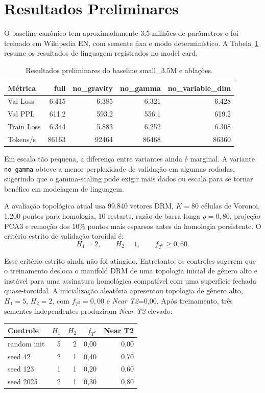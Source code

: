 \section{Resultados Preliminares}
\label{sec:resultados}

O baseline canônico tem aproximadamente 3,5 milhões de parâmetros e foi
treinado em Wikipedia EN, com semente fixa e modo determinístico. A
Tabela~\ref{tab:linguagem} resume os resultados de linguagem registrados no
model card.

\begin{table}[h]
\centering
\begin{tabular}{lrrrr}
\toprule
Métrica & full & no\_gravity & no\_gamma & no\_variable\_dim \\
\midrule
Val Loss & 6.415 & 6.385 & 6.321 & 6.428 \\
Val PPL & 611.2 & 593.2 & 556.1 & 619.2 \\
Train Loss & 6.344 & 5.883 & 6.252 & 6.308 \\
Tokens/s & 86163 & 92464 & 86468 & 86360 \\
\bottomrule
\end{tabular}
\caption{Resultados preliminares do baseline small\_3.5M e ablações.}
\label{tab:linguagem}
\end{table}

Em escala tão pequena, a diferença entre variantes ainda é marginal. A
variante \texttt{no\_gamma} obteve a menor perplexidade de validação em algumas
rodadas, sugerindo que o gamma-scaling pode exigir mais dados ou escala para se
tornar benéfico em modelagem de linguagem.

A avaliação topológica atual usa 99.840 vetores DRM, $K=80$ células de
Voronoi, 1.200 pontos para homologia, 10 restarts, razão de barra longa
$\rho=0{,}80$, projeção PCA3 e remoção dos 10\% pontos mais esparsos antes da
homologia persistente. O critério estrito de validação toroidal é:
\begin{equation}
  H_1=2,\qquad H_2=1,\qquad f_{T^2}\geq 0{,}60.
\end{equation}

Esse critério estrito ainda não foi atingido. Entretanto, os controles sugerem
que o treinamento desloca o manifold DRM de uma topologia inicial de gênero
alto e instável para uma assinatura homológica compatível com uma superfície
fechada quase-toroidal. A inicialização aleatória apresentou topologia de
gênero alto, $H_1=5$, $H_2=2$, com $f_{T^2}=0{,}00$ e \emph{Near T2}=0{,}00.
Após treinamento, três sementes independentes produziram \emph{Near T2}
elevado:
\begin{center}
\begin{tabular}{lrrrr}
\toprule
Controle & $H_1$ & $H_2$ & $f_{T^2}$ & Near T2 \\
\midrule
random init & 5 & 2 & 0{,}00 & 0{,}00 \\
seed 42 & 2 & 1 & 0{,}40 & 0{,}70 \\
seed 123 & 1 & 1 & 0{,}20 & 0{,}60 \\
seed 2025 & 2 & 1 & 0{,}30 & 0{,}80 \\
\bottomrule
\end{tabular}
\end{center}

